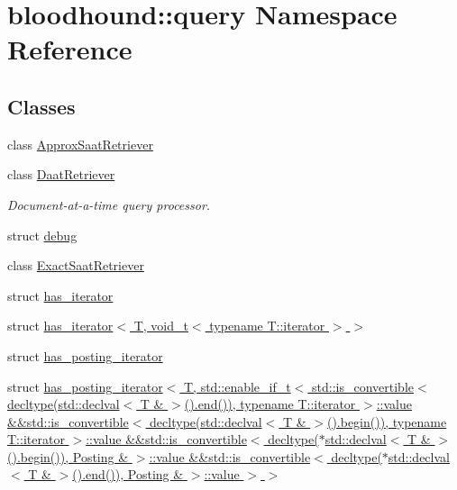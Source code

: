 \hypertarget{namespacebloodhound_1_1query}{}\section{bloodhound\+:\+:query Namespace Reference}
\label{namespacebloodhound_1_1query}
\subsection*{Classes}
\begin{DoxyCompactItemize}
\item 
class \hyperlink{classbloodhound_1_1query_1_1ApproxSaatRetriever}{Approx\+Saat\+Retriever}
\item 
class \hyperlink{classbloodhound_1_1query_1_1DaatRetriever}{Daat\+Retriever}
\begin{DoxyCompactList}\small\item\em Document-\/at-\/a-\/time query processor. \end{DoxyCompactList}\item 
struct \hyperlink{structbloodhound_1_1query_1_1debug}{debug}
\item 
class \hyperlink{classbloodhound_1_1query_1_1ExactSaatRetriever}{Exact\+Saat\+Retriever}
\item 
struct \hyperlink{structbloodhound_1_1query_1_1has__iterator}{has\+\_\+iterator}
\item 
struct \hyperlink{structbloodhound_1_1query_1_1has__iterator_3_01T_00_01void__t_3_01typename_01T_1_1iterator_01_4_01_4}{has\+\_\+iterator$<$ T, void\+\_\+t$<$ typename T\+::iterator $>$ $>$}
\item 
struct \hyperlink{structbloodhound_1_1query_1_1has__posting__iterator}{has\+\_\+posting\+\_\+iterator}
\item 
struct \hyperlink{structbloodhound_1_1query_1_1has__posting__iterator_3_01T_00_01std_1_1enable__if__t_3_01std_1_1i3aad327a30d60305d06d5c73680c1a38}{has\+\_\+posting\+\_\+iterator$<$ T, std\+::enable\+\_\+if\+\_\+t$<$ std\+::is\+\_\+convertible$<$ decltype(std\+::declval$<$ T \& $>$().\+end()), typename T\+::iterator $>$\+::value \&\&std\+::is\+\_\+convertible$<$ decltype(std\+::declval$<$ T \& $>$().\+begin()), typename T\+::iterator $>$\+::value \&\&std\+::is\+\_\+convertible$<$ decltype($\ast$std\+::declval$<$ T \& $>$().\+begin()), Posting \& $>$\+::value \&\&std\+::is\+\_\+convertible$<$ decltype($\ast$std\+::declval$<$ T \& $>$().\+end()), Posting \& $>$\+::value $>$ $>$}
\item 

\end{DoxyCompactItemize}
